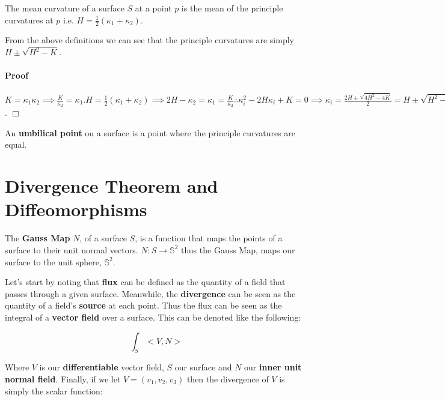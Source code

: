 \documentclass[a4paper,12pt]{report}
\begin{document}
\begin{definition}
The mean curvature of a surface $S$ at a point $p$ is the mean of the principle curvatures at $p$ i.e. $H = \frac{1}{2}(\kappa_{1}+\kappa_{2})$.
\end{definition}

\begin{remark}
From the above definitions we can see that the principle curvatures are simply $H\pm \sqrt{H^{2}-K}$.
\end{remark}

\paragraph{Proof} $K = \kappa_{1}\kappa_{2} \implies \frac{K}{\kappa_{2}} = \kappa_{1}. H = \frac{1}{2}(\kappa_{1}+\kappa_{2}) \implies 2H - \kappa_{2} = \kappa_{1} = \frac{K}{\kappa_{2}} \therefore \kappa_{i}^{2} - 2H\kappa_{i} + K = 0 \implies \kappa_{i} = \frac{2H \pm \sqrt{4H^{2}-4K}}{2} = H \pm \sqrt{H^{2}-K}$. \hfill $\Box$

\begin{definition}
An \textbf{umbilical point} on a surface is a point where the principle curvatures are equal.
\end{definition}

\section{Divergence Theorem and Diffeomorphisms}

\begin{definition}
The \textbf{Gauss Map} $N$, of a surface $S$, is a function that maps the points of a surface to their unit normal vectors. $N: S \rightarrow \mathbb{S}^{2}$ thus the Gauss Map, maps our surface to the unit sphere, $\mathbb{S}^{2}$.
\end{definition}

Let's start by noting that \textbf{flux} can be defined as the quantity of a field that passes through a given surface. Meanwhile, the \textbf{divergence} can be seen as the quantity of a field's \textbf{source} at each point. Thus the flux can be seen as the integral of a \textbf{vector field} over a surface. This can be denoted like the following:

\begin{equation}
\int_{S} <V,N>
\end{equation}

\hspace{-0.8cm} Where $V$ is our \textbf{differentiable} vector field,  $S$ our surface and $N$ our \textbf{inner unit normal field}. Finally, if we let $V = (v_{1},v_{2},v_{3})$ then the divergence of $V$ is simply the scalar function:
\end{document}
